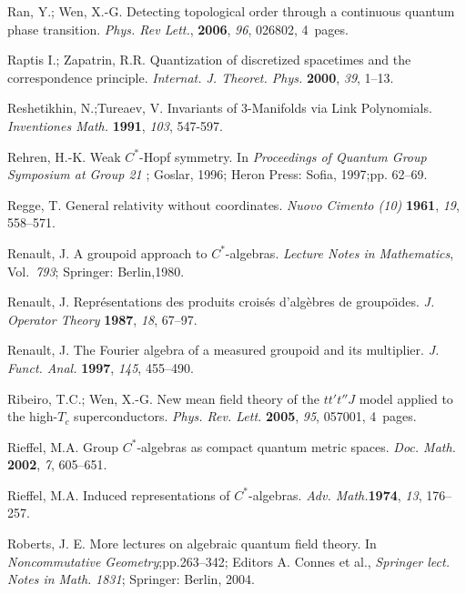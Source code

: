 \documentclass[12pt]{article}
\theoremstyle{plain}
\theoremstyle{definition}
\numberwithin{equation}{section}
\begin{document}
\begin{thebibliography}{199}
Ran, Y.; Wen, X.-G. Detecting topological order through a continuous quantum phase transition. {\em Phys. Rev Lett.}, {\bf 2006}, {\em 96}, 026802, 4~pages.

Raptis I.; Zapatrin, R.R. Quantization of discretized spacetimes and the correspondence principle. {\em Internat. J. Theoret. Phys.} {\bf 2000}, {\em 39}, 1--13.

Reshetikhin, N.;Tureaev, V. Invariants of 3-Manifolds via Link Polynomials. {\em Inventiones Math.} {\bf 1991}, {\em 103}, 547-597.

Rehren, H.-K. Weak $C^*$-Hopf symmetry. In {\em Proceedings of Quantum Group Symposium at Group 21} ; Goslar, 1996; Heron Press: Sofia, 1997;pp. 62--69. %

Regge, T.  General relativity without coordinates. {\em Nuovo Cimento (10)} {\bf 1961}, {\em 19}, 558--571.

Renault, J.  A groupoid approach to $C^*$-algebras. {\em Lecture Notes in Mathematics}, Vol.~{\em 793}; Springer: Berlin,1980.

Renault, J.  Repr\'esentations des produits crois\'es d'alg\`ebres de groupo\"{\i}des. {\em J. Operator Theory} {\bf 1987}, {\em 18}, 67--97.

Renault, J. The Fourier algebra of a measured groupoid and its multiplier. {\em J. Funct. Anal.} {\bf 1997}, {\em 145}, 455--490.

Ribeiro, T.C.; Wen, X.-G.  New mean f\/ield theory of the $tt't''J$ model applied to the high-$T_c$ superconductors. {\em Phys. Rev. Lett.} {\bf 2005}, {\em 95}, 057001, 4~pages. 

Rieffel, M.A. Group $C^*$-algebras as compact quantum metric spaces. \emph{Doc. Math.}  {\bf 2002}, {\em 7}, 605--651.

Rieffel, M.A.  Induced representations of $C^*$-algebras. {\em Adv. Math.}{\bf 1974}, {\em 13}, 176--257.

Roberts, J. E.  More lectures on algebraic quantum field theory. In {\em Noncommutative Geometry};pp.263--342; Editors A. Connes et al., \textit{Springer lect. Notes in Math.} \emph{1831}; Springer: Berlin, 2004.


\end{thebibliography}
\end{document}
